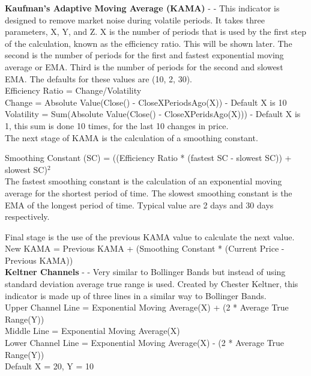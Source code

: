 \documentclass[conference]{IEEEtran}
\begin{document}

\noindent
\textbf{Kaufman's Adaptive Moving Average (KAMA)} - \cite{Kaufman1998} - This indicator is designed to remove market noise during volatile periods. It takes three parameters, X, Y, and Z. X is the number of periods that is used by the first step of the calculation, known as the efficiency ratio. This will be shown later. The second is the number of periods for the first and fastest exponential moving average or EMA. Third is the number of periods for the second and slowest EMA. The defaults for these values are (10, 2, 30). \\

\noindent
Efficiency Ratio = Change/Volatility\\
Change = Absolute Value(Close() - CloseXPeriodsAgo(X)) - Default X is 10 \\
Volatility = Sum(Absolute Value(Close() - CloseXPeridsAgo(X))) - Default X is 1, this sum is done 10 times, for the last 10 changes in price.\\

\noindent
The next stage of KAMA is the calculation of a smoothing constant. 

\noindent
Smoothing Constant (SC) = ((Efficiency Ratio * (fastest SC - slowest SC)) + slowest SC)$^2$\\
The fastest smoothing constant is the calculation of an exponential moving average for the shortest period of time. The slowest smoothing constant is the EMA of the longest period of time. Typical value are 2 days and 30 days respectively.

\noindent
Final stage is the use of the previous KAMA value to calculate the next value. \\
New KAMA = Previous KAMA + (Smoothing Constant * (Current Price - Previous KAMA))\\

\noindent
\textbf{Keltner Channels} - \cite{Keltner1960} - Very similar to Bollinger Bands but instead of using standard deviation average true range is used. Created by Chester Keltner, this indicator is made up of three lines in a similar way to Bollinger Bands.\\

\noindent
Upper Channel Line = Exponential Moving Average(X) + (2 * Average True Range(Y))\\
Middle Line = Exponential Moving Average(X)\\
Lower Channel Line = Exponential Moving Average(X) - (2 * Average True Range(Y))\\ Default X = 20, Y = 10 \\
\end{document}
